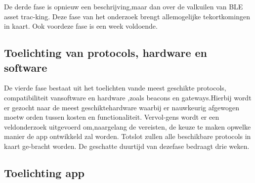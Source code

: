De derde fase is opnieuw een beschrijving,maar dan over de valkuilen van BLE asset trac-king.  Deze fase van het onderzoek brengt allemogelijke tekortkomingen in kaart.  Ook voordeze fase is een week voldoende.
\subsection{Toelichting van protocols, hardware en software}

De vierde fase bestaat uit het toelichten vande meest geschikte protocols, compatibiliteit vansoftware en hardware ,zoals beacons en gateways.Hierbij wordt er gezocht naar de meest geschiktehardware waarbij er nauwkeurig afgewogen moetw orden tussen kosten en functionaliteit. Vervol-gens wordt er een veldonderzoek uitgevoerd om,naargelang de vereisten, de keuze te maken opwelke manier de app ontwikkeld zal worden. Totslot zullen alle beschikbare protocols in kaart ge-bracht worden. De geschatte duurtijd van dezefase bedraagt drie weken.

\subsection{Toelichting app}

